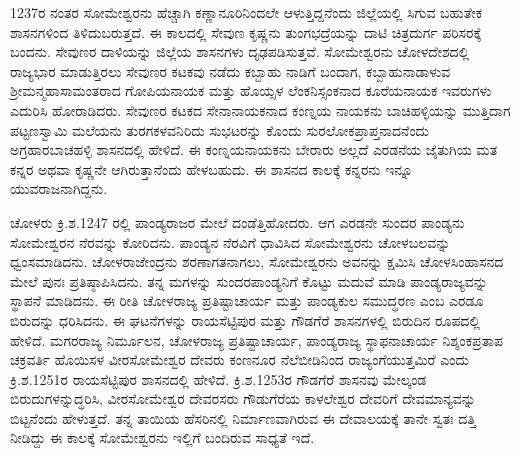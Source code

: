 1237ರ ನಂತರ ಸೋಮೇಶ್ವರನು ಹೆಚ್ಚಾಗಿ ಕಣ್ಣಾನೂರಿನಿಂದಲೇ ಆಳುತ್ತಿದ್ದನೆಂದು ಜಿಲ್ಲೆಯಲ್ಲಿ ಸಿಗುವ ಬಹುತೇಕ ಶಾಸನಗಳಿಂದ ತಿಳಿದುಬರುತ್ತದೆ. ಈ ಕಾಲದಲ್ಲಿ ಸೇವುಣ ಕೃಷ್ಣನು ತುಂಗಭದ್ರೆಯನ್ನು ದಾಟಿ ಚಿತ್ರದುರ್ಗ ಪರಿಸರಕ್ಕೆ ಬಂದನು. ಸೇವುಣರ ದಾಳಿಯನ್ನು ಜಿಲ್ಲೆಯ ಶಾಸನಗಳು ದೃಢಪಡಿಸುತ್ತವೆ. ಸೋಮೇಶ್ವರನು ಚೋಳದೇಶದಲ್ಲಿ ರಾಜ್ಯಭಾರ ಮಾಡುತ್ತಿರಲು ಸೇವುಣರ ಕಟಕವು ನಡೆದು ಕಬ್ಬಾಹು ನಾಡಿಗೆ ಬಂದಾಗ, ಕಬ್ಬಾಹುನಾಡಾಳುವ ಶ‍್ರೀಮನ್ಮಹಾಸಾಮಂತರಾದ ಗೋಪಿಯನಾಯಕ ಮತ್ತು ಹೊಯ್ಸಳ ಲೆಂಕನಿಸ್ಸಂಕನಾದ ಕೂರೆಯನಾಯಕ ಇವರುಗಳು ಎದುರಿಸಿ ಹೋರಾಡಿದರು. ಸೇವುಣರ ಕಟಕದ ಸೇನಾನಾಯಕನಾದ ಕಂಣ್ನಯ ನಾಯಕನು ಬಾಚಿಹಳ್ಳಿಯನ್ನು ಮುತ್ತಿದಾಗ ಪಟ್ಟಣಸ್ವಾಮಿ ಮಲೆಯನು ತುರಗಕಳವನಿರಿದು ಸುಭಟರನ್ನು ಕೊಂದು ಸುರಲೋಕಪ್ರಾಪ್ತನಾದನೆಂದು ಅಗ್ರಹಾರಬಾಚಹಳ್ಳಿ ಶಾಸನದಲ್ಲಿ ಹೇಳಿದೆ. ಈ ಕಂಣ್ನಯನಾಯಕನು ಬೇರಾರು ಅಲ್ಲದೆ ಎರಡನೆಯ ಜೈತುಗಿಯ ಮತ ಕನ್ನರ ಅಥವಾ ಕೃಷ್ಣನೇ ಆಗಿರುತ್ತಾನೆಂದು ಹೇಳಬಹುದು. ಈ ಶಾಸನದ ಕಾಲಕ್ಕೆ ಕನ್ನರನು ಇನ್ನೂ ಯುವರಾಜನಾಗಿದ್ದನು. 

ಚೋಳರು ಕ್ರಿ.ಶ.1247 ರಲ್ಲಿ ಪಾಂಡ್ಯರಾಜರ ಮೇಲೆ ದಂಡೆತ್ತಿಹೋದರು. ಆಗ ಎರಡನೇ ಸುಂದರ ಪಾಂಡ್ಯನು ಸೋಮೇಶ್ವರನ ನೆರವನ್ನು ಕೋರಿದನು. ಪಾಂಡ್ಯನ ನೆರವಿಗೆ ಧಾವಿಸಿದ ಸೋಮೇಶ್ವರನು ಚೋಳಬಲವನ್ನು ಧ್ವಂಸಮಾಡಿದನು. ಚೋಳರಾಜೇಂದ್ರನು ಶರಣಾಗತನಾಗಲು, ಸೋಮೇಶ್ವರನು ಅವನನ್ನು ಕ್ಷಮಿಸಿ ಚೋಳಸಿಂಹಾಸನದ ಮೇಲೆ ಪುನಃ ಪ್ರತಿಷ್ಠಾಪಿ\-ಸಿದನು. ತನ್ನ ಮಗಳನ್ನು ಸುಂದರಪಾಂಡ್ಯನಿಗೆ ಕೊಟ್ಟು ಮದುವೆ ಮಾಡಿ ಪಾಂಡ್ಯರಾಜ್ಯವನ್ನು ಸ್ಥಾಪನೆ ಮಾಡಿದನು. ಈ ರೀತಿ ಚೋಳರಾಜ್ಯ ಪ್ರತಿಷ್ಟಾಚಾರ್ಯ ಮತ್ತು ಪಾಂಡ್ಯಕುಲ ಸಮುದ್ಧರಣ ಎಂಬ ಎರಡೂ ಬಿರುದನ್ನು ಧರಿಸಿದನು. ಈ ಘಟನೆಗಳನ್ನು ರಾಯಸೆಟ್ಟಿಪುರ ಮತ್ತು ಗೌಡಗೆರೆ ಶಾಸನಗಳಲ್ಲಿ ಬಿರುದಿನ ರೂಪದಲ್ಲಿ ಹೇಳಿದೆ. ಮಗರರಾಜ್ಯ ನಿರ್ಮೂಲನ, ಚೋಳರಾಜ್ಯ ಪ್ರತಿಷ್ಟಾಚಾರ್ಯ, ಪಾಂಡ್ಯರಾಜ್ಯ ಸ್ಥಾಫನಾಚಾರ್ಯ ನಿಶ್ಶಂಕಪ್ರತಾಪ ಚಕ್ರವರ್ತಿ ಹೊಯಿಸಳ ವೀರಸೋಮೇಶ್ವರ ದೇವರು ಕಂಣನೂರ ನೆಲೆಬೀಡಿನಿಂದ ರಾಜ್ಯಂಗೆಯುತ್ತಮಿರೆ ಎಂದು ಕ್ರಿ.ಶ.1251ರ ರಾಯಸೆಟ್ಟಿಪುರ ಶಾಸನದಲ್ಲಿ ಹೇಳಿದೆ. ಕ್ರಿ.ಶ.1253ರ ಗೌಡಗೆರೆ ಶಾಸನವು ಮೇಲ್ಕಂಡ ಬಿರುದುಗಳನ್ನುದ್ಧರಿಸಿ, ವೀರಸೋಮೇಶ್ವರ ದೇವರಸರು ಗೌಡುಗೆರೆಯ ಕಾಳಲೇಶ್ವರ ದೇವರಿಗೆ ದೇವಮಾನ್ಯವನ್ನು ಬಿಟ್ಟನೆಂದು ಹೇಳುತ್ತದೆ. ತನ್ನ ತಾಯಿಯ ಹೆಸರಿನಲ್ಲಿ ನಿರ್ಮಾಣವಾಗಿರುವ ಈ ದೇವಾಲಯಕ್ಕೆ ತಾನೇ ಸ್ವತಃ ದತ್ತಿ ನೀಡಿದ್ದು ಈ ಕಾಲಕ್ಕೆ ಸೋಮೇಶ್ವರನು ಇಲ್ಲಿಗೆ ಬಂದಿರುವ ಸಾಧ್ಯತೆ ಇದೆ.


